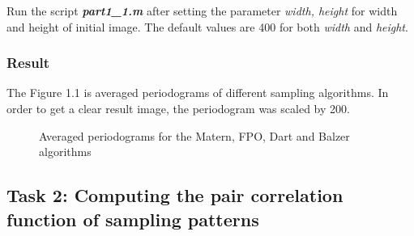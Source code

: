 \documentclass[paper=a4, fontsize=11pt]{scrartcl} %
\numberwithin{equation}{section} %
\numberwithin{figure}{section} %
\numberwithin{table}{section} %
\newcommand{\filename}[1]{\textbf{\textit{#1}}}
\begin{document}
Run the script \filename{part1\_1.m} after setting the parameter \textit{width, height} for width and height of initial image. The default values are 400 for both \textit{width} and \textit{height}.

\subsubsection{Result}

The Figure 1.1 is averaged periodograms of different sampling algorithms. In order to get a clear result image, the periodogram was scaled by 200.

\begin{figure}[t]
\caption{Averaged periodograms for the Matern, FPO, Dart and Balzer algorithms\label{fig:simple}}
\noindent{}
\end{figure}

\pagebreak

\subsection{Task 2: Computing the pair correlation function of sampling patterns}
\end{document}
